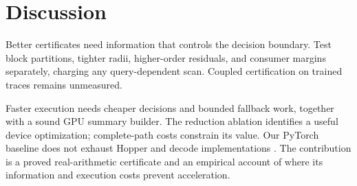 \section{Discussion}
\label{sec:discussion}

Better certificates need information that controls the decision boundary.
Test block partitions, tighter radii, higher-order residuals, and consumer
margins separately, charging any query-dependent scan. Coupled certification
on trained traces remains unmeasured.

Faster execution needs cheaper decisions and bounded fallback work, together
with a sound GPU summary builder. The reduction ablation identifies a useful
device optimization; complete-path costs constrain its value. Our PyTorch
baseline does not exhaust Hopper and decode implementations
\citep{flashattention3,leanattention}. The contribution is a proved
real-arithmetic certificate and an empirical account of where its information
and execution costs prevent acceleration.
